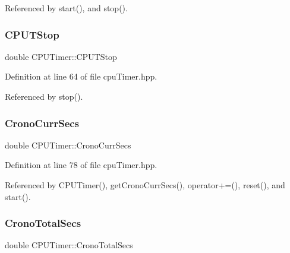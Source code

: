 Referenced by start(), and stop().

\mbox{\label{class_c_p_u_timer_a02e800ccdca6291ee1d00b4c805d69c1}} 
\subsubsection{\texorpdfstring{C\+P\+U\+T\+Stop}{CPUTStop}}
{\footnotesize\ttfamily double C\+P\+U\+Timer\+::\+C\+P\+U\+T\+Stop\hspace{0.3cm}{\ttfamily [private]}}



Definition at line 64 of file cpu\+Timer.\+hpp.



Referenced by stop().

\mbox{\label{class_c_p_u_timer_a5cd38d0e4893710f1c85f1aa03961cbc}} 
\subsubsection{\texorpdfstring{Crono\+Curr\+Secs}{CronoCurrSecs}}
{\footnotesize\ttfamily double C\+P\+U\+Timer\+::\+Crono\+Curr\+Secs\hspace{0.3cm}{\ttfamily [private]}}



Definition at line 78 of file cpu\+Timer.\+hpp.



Referenced by C\+P\+U\+Timer(), get\+Crono\+Curr\+Secs(), operator+=(), reset(), and start().

\mbox{\label{class_c_p_u_timer_a9c8ac2ee9f44e8b4365321698cf17493}} 
\subsubsection{\texorpdfstring{Crono\+Total\+Secs}{CronoTotalSecs}}
{\footnotesize\ttfamily double C\+P\+U\+Timer\+::\+Crono\+Total\+Secs\hspace{0.3cm}{\ttfamily [private]}}



